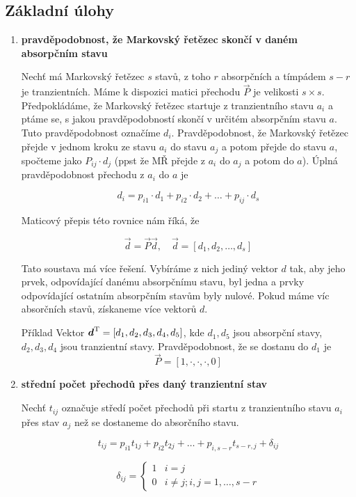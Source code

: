 \subsection{Základní úlohy}
\begin{enumerate}[label=\arabic*)]
\item \textbf{pravděpodobnost, že Markovský řetězec skončí v daném absorpčním stavu}\br

	Nechť má Markovský řetězec $s$ stavů, z toho $r$ absorpčních a tímpádem $s-r$ je tranzientních. Máme k dispozici matici přechodu $\vec{P}$ je velikosti $s\times s$. Předpokládáme, že Markovský řetězec startuje z tranzientního stavu $a_i$ a ptáme se, s jakou pravděpodobností skončí v určitém absorpčním stavu $a$. Tuto pravděpodobnost označíme $d_i$. Pravděpodobnost, že Markovský řetězec přejde v jednom kroku ze stavu $a_i$ do stavu $a_j$ a potom přejde do stavu $a$, spočteme jako $P_{ij}\cdot d_j$ (ppst že MŘ přejde z $a_i$ do $a_j$ a potom do $a$). Úplná pravděpodobnost přechodu z $a_i$ do $a$ je

	\[ d_i=p_{i1}\cdot d_1+ p_{i2}\cdot d_2 + \ldots + p_{ij}\cdot d_s \]

	Maticový přepis této rovnice nám říká, že

	\[ \vec{d} = \vec{P}\vec{d},\quad \vec{d}=[d_1,d_2,\ldots,d_s] \]

	Tato soustava má více řešení. Vybíráme z nich jediný vektor $d$ tak, aby jeho prvek, odpovídající danému absorpčnímu stavu,  byl jedna a prvky odpovídající ostatním absorpčním stavům byly nulové. Pokud máme víc absorčních stavů, získaneme více vektorů $d$.

	\begin{note}{Příklad}
		Vektor $\boldsymbol{d}^{\mathrm{T}}=[d_1,d_2,d_3,d_4,d_5]$, kde $d_1,d_5$ jsou absorpční stavy, $d_2,d_3,d_4$ jsou tranzientní stavy. Pravděpodobnost, že se dostanu do $d_1$ je
		\[ \vec{P} = [1,\cdot,\cdot,\cdot,0] \]

	\end{note}

\item \textbf{střední počet přechodů přes daný tranzientní stav}\br

	Nechť $t_{ij}$ označuje středí počet přechodů při startu z tranzientního stavu $a_i$ přes stav $a_j$ než se dostaneme do absorčního stavu.

	\[ t_{ij}=p_{i1}t_{1j}+p_{i2}t_{2j}+\ldots+p_{i,s-r}t_{s-r,j}+\delta_{ij} \]

	\[ \delta_{ij}=
	\begin{cases}
	1 & i=j\\
	0 & i\neq j; i,j = 1,\ldots, s-r
	\end{cases}
	\]


\end{enumerate}
